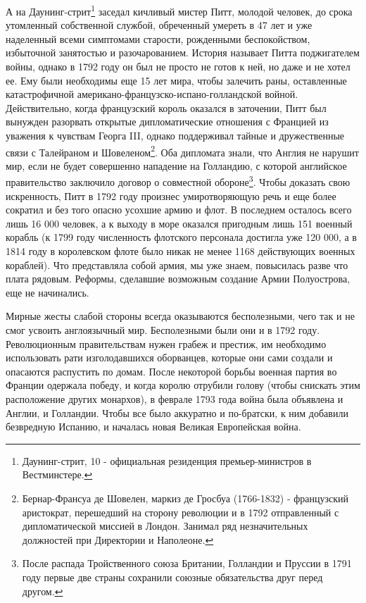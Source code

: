 \documentclass[
  oneside,
  12pt,
  titlepage]{book}
\begin{document}
А на Даунинг-стрит\footnote{Даунинг-стрит, 10 - официальная резиденция премьер-министров в Вестминстере.} заседал кичливый мистер Питт, молодой человек, до срока утомленный собственной службой, обреченный умереть в 47 лет и уже наделенный всеми симптомами старости, рожденными беспокойством, избыточной занятостью и разочарованием. История называет Питта поджигателем войны, однако в 1792 году он был не просто не готов к ней, но даже и не хотел ее. Ему были необходимы еще 15 лет мира, чтобы залечить раны, оставленные катастрофичной американо-французско-испано-голландской войной. Действительно, когда французский король оказался в заточении, Питт был вынужден разорвать открытые дипломатические отношения с Францией из уважения к чувствам Георга III, однако поддерживал тайные и дружественные связи с Талейраном и Шовеленом\footnote{Бернар-Франсуа де Шовелен, маркиз де Гросбуа (1766-1832) - французский аристократ, перешедший на сторону революции и в 1792 отправленный с дипломатической миссией в Лондон. Занимал ряд незначительных должностей при Директории и Наполеоне.}. Оба дипломата знали, что Англия не нарушит мир, если не будет совершенно нападение на Голландию, с которой английское правительство заключило договор о совместной обороне\footnote{После распада Тройственного союза Британии, Голландии и Пруссии в 1791 году первые две страны сохранили союзные обязательства друг перед другом.}. Чтобы доказать свою искренность, Питт в 1792 году произнес умиротворяющую речь и еще более сократил и без того опасно усохшие армию и флот. В последнем осталось всего лишь 16 000 человек, а к выходу в море оказался пригодным лишь 151 военный корабль (к 1799 году численность флотского персонала достигла уже 120 000, а в 1814 году в королевском флоте было никак не менее 1168 действующих военных кораблей). Что представляла собой армия, мы уже знаем, повысилась разве что плата рядовым. Реформы, сделавшие возможным создание Армии Полуострова, еще не начинались.

Мирные жесты слабой стороны всегда оказываются бесполезными, чего так и не смог усвоить англоязычный мир. Бесполезными были они и в 1792 году. Революционным правительствам нужен грабеж и престиж, им необходимо использовать рати изголодавшихся оборванцев, которые они сами создали и опасаются распустить по домам. После некоторой борьбы военная партия во Франции одержала победу, и когда королю отрубили голову (чтобы снискать этим расположение других монархов), в феврале 1793 года война была объявлена и Англии, и Голландии. Чтобы все было аккуратно и по-братски, к ним добавили безвредную Испанию, и началась новая Великая Европейская война.
\end{document}

